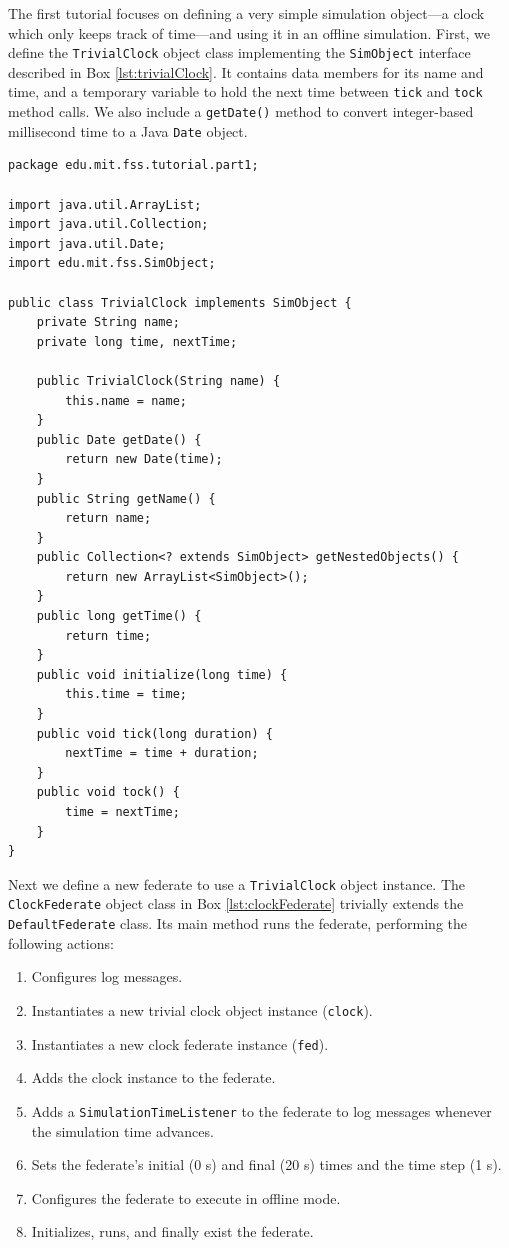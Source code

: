 \documentclass[]{article}
\begin{document}
The first tutorial focuses on defining a very simple simulation object---a clock which only keeps track of time---and using it in an offline simulation. First, we define the \texttt{TrivialClock} object class implementing the \texttt{SimObject} interface described in Box \ref{lst:trivialClock}. It contains data members for its name and time, and a temporary variable to hold the next time between \texttt{tick} and \texttt{tock} method calls. We also include a \texttt{getDate()} method to convert integer-based millisecond time to a Java \texttt{Date} object.

\begin{Code}
\begin{lstlisting}[caption={TrivialClock object class},label={lst:trivialClock}]
package edu.mit.fss.tutorial.part1;

import java.util.ArrayList;
import java.util.Collection;
import java.util.Date;
import edu.mit.fss.SimObject;

public class TrivialClock implements SimObject {
	private String name;
	private long time, nextTime;
	
	public TrivialClock(String name) {
		this.name = name;
	}
	public Date getDate() {
		return new Date(time);
	}
	public String getName() {
		return name;
	}
	public Collection<? extends SimObject> getNestedObjects() {
		return new ArrayList<SimObject>();
	}
	public long getTime() {
		return time;
	}
	public void initialize(long time) {
		this.time = time;
	}
	public void tick(long duration) {
		nextTime = time + duration;
	}
	public void tock() {
		time = nextTime;
	}
}
\end{lstlisting}
\end{Code}

Next we define a new federate to use a \texttt{TrivialClock} object instance. The \texttt{ClockFederate} object class in Box \ref{lst:clockFederate} trivially extends the \texttt{DefaultFederate} class. Its main method runs the federate, performing the following actions:
\begin{enumerate}
\item Configures log messages.
\item Instantiates a new trivial clock object instance (\texttt{clock}).
\item Instantiates a new clock federate instance (\texttt{fed}).
\item Adds the clock instance to the federate.
\item Adds a \texttt{SimulationTimeListener} to the federate to log messages whenever the simulation time advances.
\item Sets the federate's initial (0 s) and final (20 s) times and the time step (1 s).
\item Configures the federate to execute in offline mode.
\item Initializes, runs, and finally exist the federate.
\end{enumerate}
\end{document}
